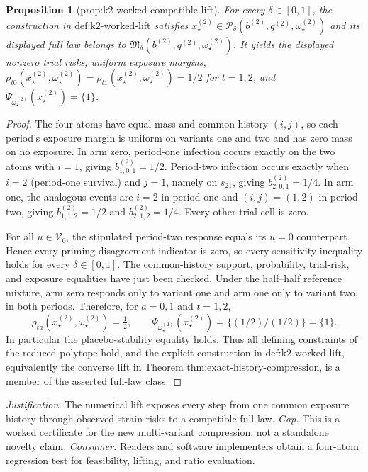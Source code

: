 \documentclass{article}
\newtheorem{proposition}{Proposition}
\begin{document}
\begin{proposition}[prop:k2-worked-compatible-lift]\label{prop:k2-worked-compatible-lift}
For every \(\delta\in[0,1]\), the construction in \(\text{def:k2-worked-lift}\) satisfies \(x_\star^{(2)}\in\mathcal P_\delta(b^{(2)},q^{(2)},\omega_\star^{(2)})\) and its displayed full law belongs to \(\mathfrak M_\delta(b^{(2)},q^{(2)},\omega_\star^{(2)})\). It yields the displayed nonzero trial risks, uniform exposure margins, \(\rho_{t0}(x_\star^{(2)},\omega_\star^{(2)})=\rho_{t1}(x_\star^{(2)},\omega_\star^{(2)})=1/2\) for \(t=1,2\), and \(\Psi_{\omega_\star^{(2)}}(x_\star^{(2)})=\{1\}\).
\end{proposition}
\begin{proof}
The four atoms have equal mass and common history \((i,j)\), so each period's exposure margin is uniform on variants one and two and has zero mass on no exposure.  In arm zero, period-one infection occurs exactly on the two atoms with \(i=1\), giving \(b^{(2)}_{1,0,1}=1/2\).  Period-two infection occurs exactly when \(i=2\) (period-one survival) and \(j=1\), namely on \(s_{21}\), giving \(b^{(2)}_{2,0,1}=1/4\).  In arm one, the analogous events are \(i=2\) in period one and \((i,j)=(1,2)\) in period two, giving \(b^{(2)}_{1,1,2}=1/2\) and \(b^{(2)}_{2,1,2}=1/4\).  Every other trial cell is zero.

For all \(u\in\mathcal V_0\), the stipulated period-two response equals its \(u=0\) counterpart.  Hence every priming-disagreement indicator is zero, so every sensitivity inequality holds for every \(\delta\in[0,1]\).  The common-history support, probability, trial-risk, and exposure equalities have just been checked.  Under the half--half reference mixture, arm zero responds only to variant one and arm one only to variant two, in both periods.  Therefore, for \(a=0,1\) and \(t=1,2\),
\[
\rho_{ta}(x_\star^{(2)},\omega_\star^{(2)})=\tfrac12,
\qquad
\Psi_{\omega_\star^{(2)}}(x_\star^{(2)})=\{(1/2)/(1/2)\}=\{1\}.
\]
In particular the placebo-stability equality holds.  Thus all defining constraints of the reduced polytope hold, and the explicit construction in \(\text{def:k2-worked-lift}\), equivalently the converse lift in Theorem \(\text{thm:exact-history-compression}\), is a member of the asserted full-law class.
\end{proof}
\par\smallskip\noindent \textit{Justification.} The numerical lift exposes every step from one common exposure history through observed strain risks to a compatible full law. \textit{Gap.} This is a worked certificate for the new multi-variant compression, not a standalone novelty claim. \textit{Consumer.} Readers and software implementers obtain a four-atom regression test for feasibility, lifting, and ratio evaluation.
\end{document}
